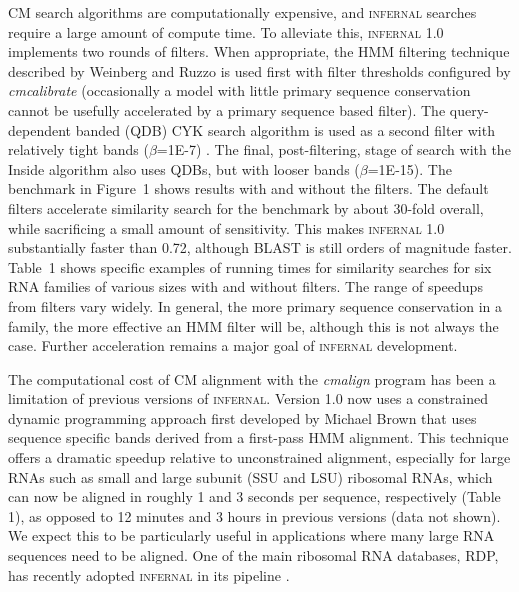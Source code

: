 CM search algorithms are computationally expensive, and
\textsc{infernal} searches require a large amount of compute time.  To
alleviate this, \textsc{infernal} 1.0 implements two rounds of
filters.  When appropriate, the HMM filtering technique described by
Weinberg and Ruzzo \citep{WeinbergRuzzo06} is used first with filter
thresholds configured by \emph{cmcalibrate} (occasionally a model with
little primary sequence conservation cannot be usefully accelerated by
a primary sequence based filter).  The query-dependent banded (QDB)
CYK search algorithm is used as a second filter with relatively tight
bands ($\beta$=1E-7) \citep{NawrockiEddy07}.  The final,
post-filtering, stage of search with the Inside algorithm also uses
QDBs, but with looser bands ($\beta$=1E-15).  The benchmark in
Figure~1 shows results with and without the filters. The default
filters accelerate similarity search for the benchmark by about
30-fold overall, while sacrificing a small amount of sensitivity. This
makes \textsc{infernal} 1.0 substantially faster than 0.72, although
\textsc{BLAST} is still orders of magnitude faster.  Table~1 shows
specific examples of running times for similarity searches for six RNA
families of various sizes with and without filters. The range of
speedups from filters vary widely. In general, the more primary
sequence conservation in a family, the more effective an HMM filter
will be, although this is not always the case. Further acceleration
remains a major goal of \textsc{infernal} development.

The computational cost of CM alignment with the \emph{cmalign} program
has been a limitation of previous versions of
\textsc{infernal}. Version 1.0 now uses a constrained dynamic
programming approach first developed by Michael Brown \citep{Brown00}
that uses sequence specific bands derived from a first-pass HMM
alignment. This technique offers a dramatic speedup relative to
unconstrained alignment, especially for large RNAs such as small and
large subunit (SSU and LSU) ribosomal RNAs, which can now be aligned
in roughly 1 and 3 seconds per sequence, respectively (Table 1), as
opposed to 12 minutes and 3 hours in previous versions (data not
shown). We expect this to be particularly useful in applications where
many large RNA sequences need to be aligned. One of the main ribosomal
RNA databases, RDP, has recently adopted \textsc{infernal} in its
pipeline \citep{Cole09}.

